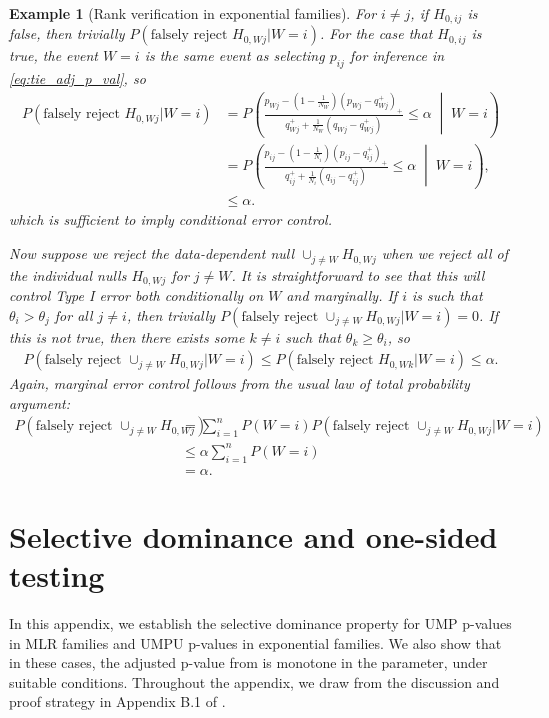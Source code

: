 \documentclass{article}
\newtheorem{example}{Example}
\begin{document}
\begin{appendix}
\begin{example}[Rank verification in exponential families]
    For $i \neq j$, if $H_{0, ij}$ is false, then trivially $P(\text{falsely reject } H_{0, Wj}| W= i)$. For the case that $H_{0, ij}$ is true, the event $W=i$ is the same event as selecting $p_{ij}$ for inference in \eqref{eq:tie_adj_p_val}, so 
    \begin{align*}
        P(\text{falsely reject } H_{0, Wj}| W= i) &= P\left(\frac{p_{Wj} - (1-\frac{1}{N_W})(p_{Wj} - q_{Wj}^+)_+ }{q_{Wj}^+ + \frac{1}{N_W}(q_{Wj} - q^+_{Wj})} \leq \alpha \;\middle|\; W= i\right) \\
        &= P\left(\frac{p_{ij} - (1-\frac{1}{N_i})(p_{ij} - q_{ij}^+)_+ }{q_{ij}^+ + \frac{1}{N_i}(q_{ij} - q^+_{ij})} \leq \alpha \;\middle|\; W = i\right), \\
        &\leq \alpha. 
    \end{align*}
    which is sufficient to imply conditional error control. 

    Now suppose we reject the data-dependent null $\cup_{j \neq W} H_{0, Wj}$ when we reject all of the individual nulls $H_{0, Wj}$ for $j \neq W$. It is straightforward to see that this will control Type I error both conditionally on $W$ and marginally. If $i$ is such that $\theta_i > \theta_j$ for all $j \neq i$, then trivially $ P(\text{falsely reject } \cup_{j \neq W} H_{0, Wj}| W= i) = 0 $. If this is not true, then there exists some $k \neq i$ such that $\theta_k \geq \theta_i$, so 
    \begin{align*}
        P(\text{falsely reject } \cup_{j \neq W} H_{0, Wj}| W= i) \leq P(\text{falsely reject } H_{0, Wk}| W= i) \leq \alpha.
    \end{align*} 
    Again, marginal error control follows from the usual law of total probability argument:
    \begin{align*}
        P(\text{falsely reject } \cup_{j \neq W} H_{0, Wj}) &= \sum_{i=1}^n P(W= i)P(\text{falsely reject } \cup_{j \neq W} H_{0, Wj} |W = i) \\
        &\leq \alpha \sum_{i=1}^n P(W=i)\\
        &=\alpha.
    \end{align*}
\end{example}

\section{Selective dominance and one-sided testing}
\label{sec:one_sided_appdx}

In this appendix, we establish the selective dominance property for UMP p-values in MLR families and UMPU p-values in exponential families. We also show that in these cases, the adjusted p-value from  is monotone in the parameter, under suitable conditions. Throughout the appendix, we draw from the discussion and proof strategy in Appendix B.1 of \cite{Lei}.


\end{appendix}
\end{document}
